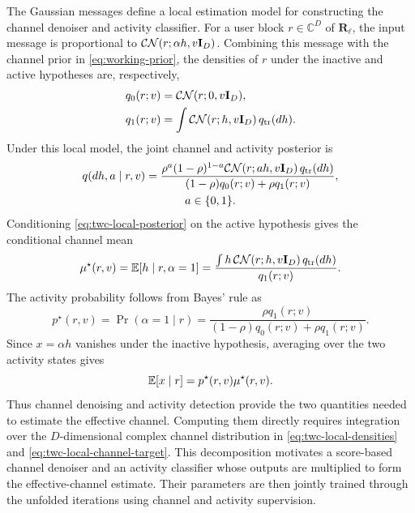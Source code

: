 The Gaussian messages define a local estimation model for constructing
the channel denoiser and activity classifier. For a user block
$r\in\mathbb C^D$ of $\mathbf R_\ell$, the input message is
proportional to $\mathcal{CN}(r;\alpha h,v\mathbf{I}_D)$.
Combining this message with the channel prior in
\eqref{eq:working-prior}, the densities of $r$ under the inactive
and active hypotheses are, respectively,
\begin{equation}
 \begin{aligned}
 q_0(r;v)&=\mathcal{CN}(r;0,v\mathbf{I}_D),\\
 q_1(r;v)&=\int\mathcal{CN}(r;h,v\mathbf{I}_D)\,q_{\rm tr}(dh).
 \end{aligned}
 \label{eq:twc-local-densities}
\end{equation}
Under this local model, the joint channel and activity posterior is
\begin{equation}
 \begin{gathered}
 q(dh,a\mid r,v)=
 \frac{\rho^a(1-\rho)^{1-a}\mathcal{CN}(r;ah,v\mathbf{I}_D)\,q_{\rm tr}(dh)}
 {(1-\rho)q_0(r;v)+\rho q_1(r;v)},\\
 a\in\{0,1\}.
 \end{gathered}
 \label{eq:twc-local-posterior}
\end{equation}
Conditioning \eqref{eq:twc-local-posterior} on the active hypothesis
gives the conditional channel mean
\begin{equation}
 \mu^\star(r,v)=\mathbb{E}[h\mid r,\alpha=1]
 =\frac{\int h\,\mathcal{CN}(r;h,v\mathbf{I}_D)\,q_{\rm tr}(dh)}{q_1(r;v)}.
 \label{eq:twc-local-channel-target}
\end{equation}
The activity probability follows from Bayes' rule as
\begin{equation}
 p^\star(r,v)=\Pr(\alpha=1\mid r)
 =\frac{\rho q_1(r;v)}
 {(1-\rho)q_0(r;v)+\rho q_1(r;v)}.
 \label{eq:twc-local-activity-target}
\end{equation}
Since $x=\alpha h$ vanishes under the inactive hypothesis, averaging
over the two activity states gives \cite{cai2026}
\begin{equation}
 \mathbb{E}[x\mid r]=p^\star(r,v)\mu^\star(r,v).
 \label{eq:twc-mixture-mean}
\end{equation}
Thus channel denoising and activity detection provide the two
quantities needed to estimate the effective channel. Computing them
directly requires integration over the $D$-dimensional complex channel
distribution in \eqref{eq:twc-local-densities} and
\eqref{eq:twc-local-channel-target}. This decomposition motivates a
score-based channel denoiser and an activity classifier whose outputs
are multiplied to form the effective-channel estimate. Their
parameters are then jointly trained through the unfolded iterations
using channel and activity supervision.

